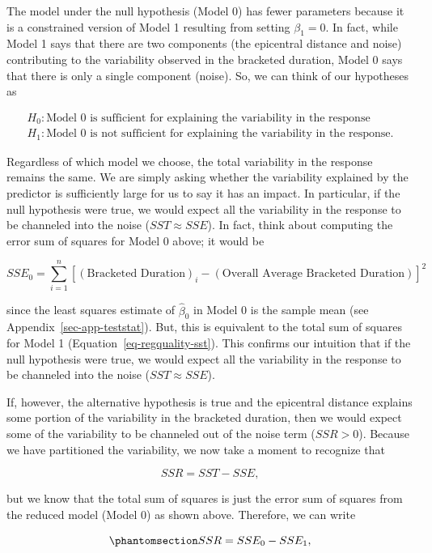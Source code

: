 \documentclass[
  letterpaper,
  DIV=11,
  numbers=noendperiod]{scrreprt}
\theoremstyle{definition}
\theoremstyle{definition}
\theoremstyle{plain}
\theoremstyle{remark}
\begin{document}
The model under the null hypothesis (Model 0) has fewer parameters
because it is a constrained version of Model 1 resulting from setting
\(\beta_1 = 0\). In fact, while Model 1 says that there are two
components (the epicentral distance and noise) contributing to the
variability observed in the bracketed duration, Model 0 says that there
is only a single component (noise). So, we can think of our hypotheses
as

\[
\begin{aligned}
  H_0: \text{Model 0 is sufficient for explaining the variability in the response} \\
  H_1: \text{Model 0 is not sufficient for explaining the variability in the response.}
\end{aligned}
\]

Regardless of which model we choose, the total variability in the
response remains the same. We are simply asking whether the variability
explained by the predictor is sufficiently large for us to say it has an
impact. In particular, if the null hypothesis were true, we would expect
all the variability in the response to be channeled into the noise
(\(SST \approx SSE\)). In fact, think about computing the error sum of
squares for Model 0 above; it would be

\[SSE_0 = \sum_{i=1}^{n} \left[(\text{Bracketed Duration})_i - (\text{Overall Average Bracketed Duration})\right]^2\]

since the least squares estimate of \(\widehat{\beta}_0\) in Model 0 is
the sample mean (see Appendix~\ref{sec-app-teststat}). But, this is
equivalent to the total sum of squares for Model 1
(Equation~\ref{eq-regquality-sst}). This confirms our intuition that if
the null hypothesis were true, we would expect all the variability in
the response to be channeled into the noise (\(SST \approx SSE\)).

If, however, the alternative hypothesis is true and the epicentral
distance explains some portion of the variability in the bracketed
duration, then we would expect some of the variability to be channeled
out of the noise term (\(SSR > 0\)). Because we have partitioned the
variability, we now take a moment to recognize that

\[SSR = SST - SSE,\]

but we know that the total sum of squares is just the error sum of
squares from the reduced model (Model 0) as shown above. Therefore, we
can write

\begin{equation}\phantomsection\label{eq-regquality-ssr-difference}{SSR = SSE_0 - SSE_1,}\end{equation}
\end{document}

